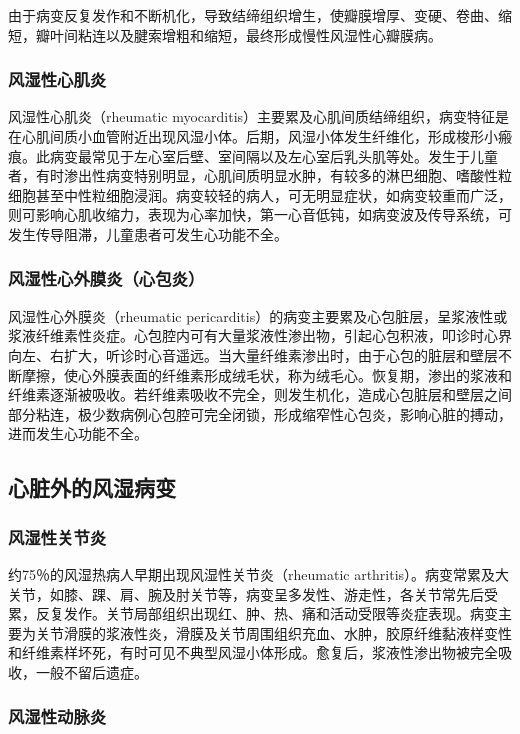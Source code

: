 由于病变反复发作和不断机化，导致结缔组织增生，使瓣膜增厚、变硬、卷曲、缩短，瓣叶间粘连以及腱索增粗和缩短，最终形成慢性风湿性心瓣膜病。

\subsubsection{风湿性心肌炎}

风湿性心肌炎（rheumatic
myocarditis）主要累及心肌间质结缔组织，病变特征是在心肌间质小血管附近出现风湿小体。后期，风湿小体发生纤维化，形成梭形小瘢痕。此病变最常见于左心室后壁、室间隔以及左心室后乳头肌等处。发生于儿童者，有时渗出性病变特别明显，心肌间质明显水肿，有较多的淋巴细胞、嗜酸性粒细胞甚至中性粒细胞浸润。病变较轻的病人，可无明显症状，如病变较重而广泛，则可影响心肌收缩力，表现为心率加快，第一心音低钝，如病变波及传导系统，可发生传导阻滞，儿童患者可发生心功能不全。

\subsubsection{风湿性心外膜炎（心包炎）}

风湿性心外膜炎（rheumatic
pericarditis）的病变主要累及心包脏层，呈浆液性或浆液纤维素性炎症。心包腔内可有大量浆液性渗出物，引起心包积液，叩诊时心界向左、右扩大，听诊时心音遥远。当大量纤维素渗出时，由于心包的脏层和壁层不断摩擦，使心外膜表面的纤维素形成绒毛状，称为绒毛心。恢复期，渗出的浆液和纤维素逐渐被吸收。若纤维素吸收不完全，则发生机化，造成心包脏层和壁层之间部分粘连，极少数病例心包腔可完全闭锁，形成缩窄性心包炎，影响心脏的搏动，进而发生心功能不全。

\subsection{心脏外的风湿病变}

\subsubsection{风湿性关节炎}

约75％的风湿热病人早期出现风湿性关节炎（rheumatic
arthritis）。病变常累及大关节，如膝、踝、肩、腕及肘关节等，病变呈多发性、游走性，各关节常先后受累，反复发作。关节局部组织出现红、肿、热、痛和活动受限等炎症表现。病变主要为关节滑膜的浆液性炎，滑膜及关节周围组织充血、水肿，胶原纤维黏液样变性和纤维素样坏死，有时可见不典型风湿小体形成。愈复后，浆液性渗出物被完全吸收，一般不留后遗症。

\subsubsection{风湿性动脉炎}

